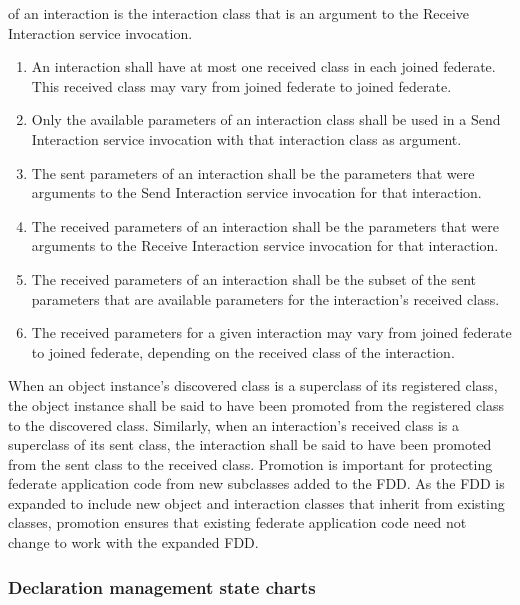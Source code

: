 \begin{compactstdpage}
    of an interaction is the interaction class that is an argument to the Receive Interaction \rtiinitiated{} service invocation.

    \begin{enumerate}[label=\alph*),leftmargin=2.35em,itemsep=1pt,topsep=3pt,parsep=0pt,start=9]
\item An interaction shall have at most one received class in each joined federate. This received class may vary from joined federate to joined federate.
\item Only the available parameters of an interaction class shall be used in a Send Interaction service invocation with that interaction class as argument.
\item The sent parameters of an interaction shall be the parameters that were arguments to the Send Interaction service invocation for that interaction.
\item The received parameters of an interaction shall be the parameters that were arguments to the Receive Interaction \rtiinitiated{} service invocation for that interaction.
\item The received parameters of an interaction shall be the subset of the sent parameters that are available parameters for the interaction's received class.
\item The received parameters for a given interaction may vary from joined federate to joined federate, depending on the received class of the interaction.
    \end{enumerate}

    When an object instance's discovered class is a superclass of its registered class, the object instance shall be said to have been promoted from the registered class to the discovered class. Similarly, when an interaction's received class is a superclass of its sent class, the interaction shall be said to have been promoted from the sent class to the received class. Promotion is important for protecting federate application code from new subclasses added to the FDD. As the FDD is expanded to include new object and interaction classes that inherit from existing classes, promotion ensures that existing federate application code need not change to work with the expanded FDD.

    \subsubsection{Declaration management state charts}


\end{compactstdpage}
